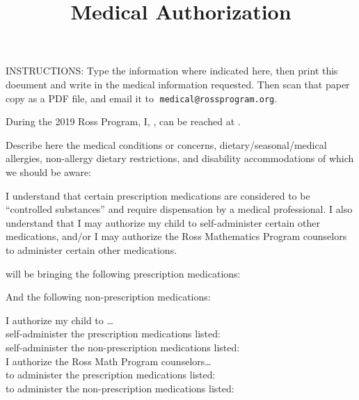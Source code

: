 \documentclass{ross}
\title{Medical Authorization}
\begin{document}
\maketitle
INSTRUCTIONS:  Type the information where indicated here, then print this doeument and write in the medical information requested. Then scan that paper copy as a PDF file, and email it to$\;$ \texttt{medical@rossprogram.org}. 


During the 2019 Ross Program, I, , can be reached at .

Describe here the medical conditions or concerns,
dietary/seasonal/medical allergies, non-allergy dietary restrictions,
and disability accommodations of which we should be aware:

\vspace{0.7in}

I understand that certain prescription medications are considered to
be ``controlled substances'' and require dispensation by a medical
professional. I also understand that I may authorize my child to
self-administer certain other medications, and/or I may authorize the
Ross Mathematics Program counselors to administer certain other
medications.


 will be bringing the following prescription medications:

\vspace{0.7in}


And the following non-prescription medications:

\vspace{0.7in}

I authorize my child to \ldots \\
self-administer the \phantom{non-}prescription medications listed:   \\
self-administer the non-prescription medications listed:   \\

I authorize the Ross Math Program counselors\ldots\\
to administer the \phantom{non-}prescription medications listed:   \\
to administer the non-prescription medications listed:   \\
\end{document}

